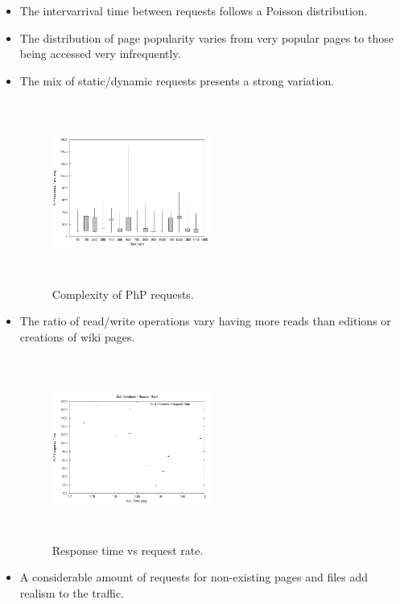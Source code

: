 \begin{itemize}
\item The intervarrival time between requests follows a Poisson distribution.

\item The distribution of page popularity varies from very popular pages to those being accessed very infrequently.

\item The mix of static/dynamic requests presents a strong variation. 

\begin{figure}
\begin{center}
\includegraphics[width=0.49\textwidth, height=6cm]{./images/phpRespTimeDispersion}
\end{center}
\caption{Complexity of PhP requests.}
\label{phpRespTimeDispersion}
\end{figure}

\item The ratio of read/write operations vary having more reads than editions or creations of wiki pages.

\begin{figure}
\begin{center}
\includegraphics[width=0.49\textwidth, height=6cm]{./images/staticProv_reqRate}
\end{center}
\caption{Response time vs request rate.}
\label{reqRate}
\end{figure}

\item A considerable amount of requests for non-existing pages and files add realism to the traffic.

\end{itemize}



